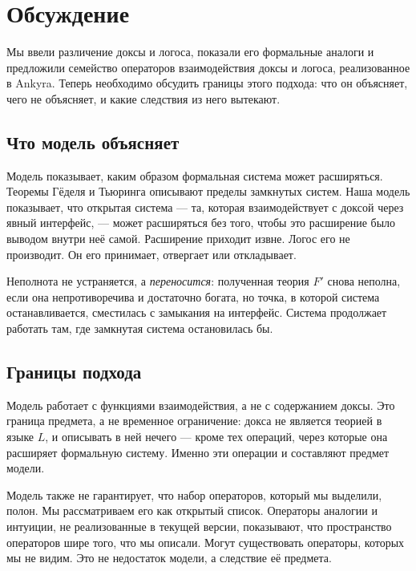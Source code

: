 \documentclass[12pt,a4paper]{article}
\begin{document}
\section{Обсуждение}
\label{sec:discussion}

Мы ввели различение доксы и логоса, показали его формальные аналоги и предложили семейство операторов
взаимодействия доксы и логоса, реализованное в Ankyra. Теперь необходимо обсудить границы этого подхода:
что он объясняет, чего не объясняет, и какие следствия из него вытекают.

\subsection{Что модель объясняет}
\label{sec:explains}

Модель показывает, каким образом формальная система может расширяться. Теоремы
Гёделя и Тьюринга описывают пределы замкнутых систем. Наша модель показывает, что
открытая система --- та, которая взаимодействует с доксой через явный интерфейс,
--- может расширяться без того, чтобы это расширение было выводом внутри неё
самой. Расширение приходит извне. Логос его не производит. Он его принимает,
отвергает или откладывает.

Неполнота не устраняется, а \emph{переносится}: полученная теория $F'$ снова
неполна, если она непротиворечива и достаточно богата, но точка, в которой система
останавливается, сместилась с замыкания на интерфейс. Система продолжает работать
там, где замкнутая система остановилась бы.

\subsection{Границы подхода}
\label{sec:limits_approach}

Модель работает с функциями взаимодействия, а не с содержанием доксы. Это граница
предмета, а не временное ограничение: докса не является теорией в языке $L$, и
описывать в ней нечего --- кроме тех операций, через которые она расширяет
формальную систему. Именно эти операции и составляют предмет модели.

Модель также не гарантирует, что набор операторов, который мы выделили, полон. Мы
рассматриваем его как открытый список. Операторы аналогии и интуиции, не реализованные
в текущей версии, показывают, что пространство операторов шире того, что мы описали.
Могут существовать операторы, которых мы не видим. Это не недостаток модели, а
следствие её предмета.
\end{document}
